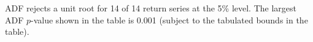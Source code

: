 ADF rejects a unit root for 14 of 14 return series at the 5\% level. The largest ADF $p$-value shown in the table is 0.001 (subject to the tabulated bounds in the table).
